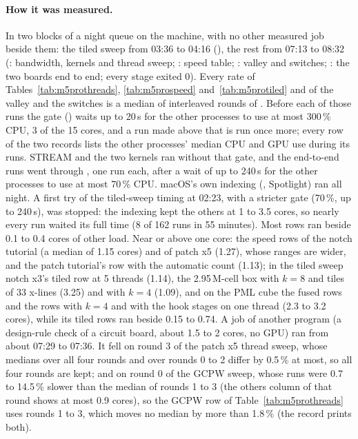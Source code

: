 \paragraph{How it was measured.} In two blocks of a night queue on the machine, with no other measured job beside
them: the tiled sweep from 03:36 to 04:16 (), the rest from 07:13 to 08:32 (:
bandwidth, kernels and thread sweep; : speed table; : valley and switches;
: the two boards end to end; every stage exited 0). Every rate of Tables~\ref{tab:m5prothreads},
\ref{tab:m5prospeed} and~\ref{tab:m5protiled} and of the valley and the switches is a median of interleaved rounds of
. Before each of those runs the gate () waits up to 20\,s for the
other processes to use at most 300\,\% CPU, 3 of the 15 cores, and a run made above that is run once more; every row
of the two records lists the other processes' median CPU and GPU use during its runs. STREAM and the two kernels ran
without that gate, and the end-to-end runs went through , one run each, after a wait of up to
240\,s for the other processes to use at most 70\,\% CPU. macOS's own indexing (, Spotlight) ran
all night. A first try of the tiled-sweep timing at 02:23, with a stricter gate (70\,\%, up to 240\,s), was stopped:
the indexing kept the others at 1 to 3.5 cores, so nearly every run waited its full time (8 of 162 runs in 55
minutes). Most rows ran beside 0.1 to 0.4 cores of other load. Near or above one core: the speed rows of the notch
tutorial (a median of 1.15 cores) and of patch x5 (1.27), whose ranges are wider, and the patch tutorial's row with the
automatic count (1.13); in the tiled sweep notch x3's tiled row at 5 threads (1.14), the 2.95\,M-cell box with $k=8$
and tiles of 33 x-lines (3.25) and with $k=4$ (1.09), and on the PML cube the fused rows and the rows with $k=4$ and
with the hook stages on one thread (2.3 to 3.2 cores), while its tiled  rows ran beside 0.15 to 0.74. A job
of another program (a design-rule check of a circuit board, about 1.5 to 2 cores, no GPU) ran from about 07:29 to
07:36. It fell on round 3 of the patch x5 thread sweep, whose medians over all four rounds and over rounds 0 to 2
differ by 0.5\,\% at most, so all four rounds are kept; and on round 0 of the GCPW sweep, whose runs were 0.7 to
14.5\,\% slower than the median of rounds 1 to 3 (the others column of that round shows at most 0.9 cores), so the
GCPW row of Table~\ref{tab:m5prothreads} uses rounds 1 to 3, which moves no median by more than 1.8\,\% (the record
prints both).


